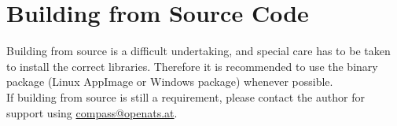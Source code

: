 \section{Building from Source Code}

Building from source is a difficult undertaking, and special care has to be taken to install the correct libraries. Therefore it is recommended to use the binary package (Linux AppImage or Windows package) whenever possible. \\

If building from source is still a requirement, please contact the author for support using \href{mailto:compass@openats.at}{compass@openats.at}.


